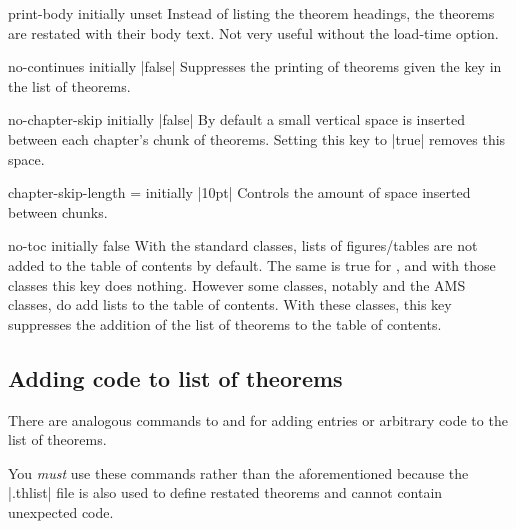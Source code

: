 \documentclass{ltxdoc}
\begin{document}
\begin{docKey}{print-body}
  {}
  {initially unset}
Instead of listing the theorem headings, the theorems are restated with their body text.
Not very useful without the  load-time option.
\end{docKey}

\begin{docKey}{no-continues}
  {}
  {initially |false|}
Suppresses the printing of theorems given the  key in the list of theorems.
\end{docKey}

\begin{docKey}{no-chapter-skip}
  {}
  {initially |false|}
By default a small vertical space is inserted between each chapter's chunk of theorems.
Setting this key to |true| removes this space.
\end{docKey}

\begin{docKey}{chapter-skip-length}
  {=}
  {initially |10pt|}
Controls the amount of space inserted between chunks.
\end{docKey}

\begin{docKey}{no-toc}
  {}
  {initially false}
With the standard classes, lists of figures/tables are not added to the table of contents by default. The same is true for , and with those classes this key does nothing. However some classes, notably  and the AMS classes, do add lists to the table of contents. With these classes, this key suppresses the addition of the list of theorems to the table of contents.
\end{docKey}

\subsection{Adding code to list of theorems}

There are analogous commands to  and  for adding entries or arbitrary code to the list of theorems.

\begin{notebox}
You \emph{must} use these commands rather than the aforementioned because the |.thlist| file is also used to define restated theorems and cannot contain unexpected code.
\end{notebox}
\end{document}
